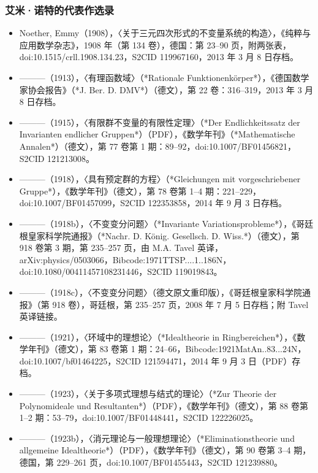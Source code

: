 \subsubsection{艾米·诺特的代表作选录}
\begin{itemize}
\item Noether, Emmy（1908），〈关于三元四次形式的不变量系统的构造〉，《纯粹与应用数学杂志》，1908 年（第 134 卷），德国：第 23–90 页，附两张表，doi:10.1515/crll.1908.134.23，S2CID 119967160，2013 年 3 月 8 日存档。

\item ———（1913），〈有理函数域〉（*Rationale Funktionenkörper*），《德国数学家协会报告》（*J. Ber. D. DMV*）（德文），第 22 卷：316–319，2013 年 3 月 8 日存档。

\item ———（1915），〈有限群不变量的有限性定理〉（*Der Endlichkeitssatz der Invarianten endlicher Gruppen*）（PDF），《数学年刊》（*Mathematische Annalen*）（德文），第 77 卷第 1 期：89–92，doi:10.1007/BF01456821，S2CID 121213008。

\item ———（1918），〈具有预定群的方程〉（*Gleichungen mit vorgeschriebener Gruppe*），《数学年刊》（德文），第 78 卷第 1–4 期：221–229，doi:10.1007/BF01457099，S2CID 122353858，2014 年 9 月 3 日存档。

\item ———（1918b），〈不变变分问题〉（*Invariante Variationsprobleme*），《哥廷根皇家科学院通报》（*Nachr. D. König. Gesellsch. D. Wiss.*）（德文），第 918 卷第 3 期，第 235–257 页，由 M.A. Tavel 英译，arXiv:physics/0503066，Bibcode:1971TTSP....1..186N，doi:10.1080/00411457108231446，S2CID 119019843。

\item ———（1918c），〈不变变分问题〉（德文原文重印版），《哥廷根皇家科学院通报》（第 918 卷），哥廷根，第 235–257 页，2008 年 7 月 5 日存档；附 Tavel 英译链接。

\item ———（1921），〈环域中的理想论〉（*Idealtheorie in Ringbereichen*），《数学年刊》（德文），第 83 卷第 1 期：24–66，Bibcode:1921MatAn..83...24N，doi:10.1007/bf01464225，S2CID 121594471，2014 年 9 月 3 日（PDF）存档。

\item ———（1923），〈关于多项式理想与结式的理论〉（*Zur Theorie der Polynomideale und Resultanten*）（PDF），《数学年刊》（德文），第 88 卷第 1–2 期：53–79，doi:10.1007/BF01448441，S2CID 122226025。

\item ———（1923b），〈消元理论与一般理想理论〉（*Eliminationstheorie und allgemeine Idealtheorie*）（PDF），《数学年刊》（德文），第 90 卷第 3–4 期，德国，第 229–261 页，doi:10.1007/BF01455443，S2CID 121239880。


\end{itemize}
